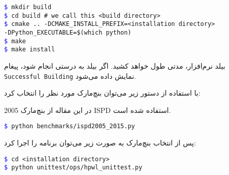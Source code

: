 \begin{latin}
	\texttt{\textcolor{blue}{\$} mkdir build}\\
	\texttt{\textcolor{blue}{\$} cd build \# we call this <build directory>}\\
	\texttt{\textcolor{blue}{\$} cmake .. -DCMAKE\_INSTALL\_PREFIX=<installation directory>}\\
	\texttt{-DPython\_EXECUTABLE=\$(which python)}\\
	\texttt{\textcolor{blue}{\$} make}\\
	\texttt{\textcolor{blue}{\$} make install}\\
\end{latin}

بیلد نرم‌افزار، مدتی طول خواهد کشید. اگر بیلد به درستی انجام شود، پیغام \texttt{Successful Building} نمایش داده می‌شود.


با استفاده از دستور زیر می‌توان بنچ‌مارک مورد نظر را انتخاب کرد:

در این مقاله از بنچ‌مارک 2005 ISPD استفاده شده است.
\begin{latin}
	\texttt{\textcolor{blue}{\$} python benchmarks/ispd2005\_2015.py}
\end{latin}

پس از انتخاب بنچ‌مارک به صورت زیر می‌توان برنامه را اجرا کرد:
\begin{latin}
	\texttt{\textcolor{blue}{\$} cd <installation directory>}\\
	\texttt{\textcolor{blue}{\$} python unittest/ops/hpwl\_unittest.py}
\end{latin}